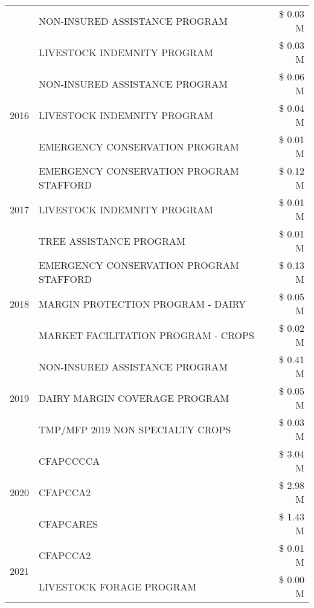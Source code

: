 \begin{tabular}{llr}
 & NON-INSURED ASSISTANCE PROGRAM & \$ 0.03 M \\
 & LIVESTOCK INDEMNITY PROGRAM & \$ 0.03 M \\
\cline{1-3}
\multirow[t]{3}{*}{2016} & NON-INSURED ASSISTANCE PROGRAM                & \$ 0.06 M \\
 & LIVESTOCK INDEMNITY PROGRAM                   & \$ 0.04 M \\
 & EMERGENCY CONSERVATION PROGRAM                & \$ 0.01 M \\
\cline{1-3}
\multirow[t]{3}{*}{2017} & EMERGENCY CONSERVATION PROGRAM STAFFORD & \$ 0.12 M \\
 & LIVESTOCK INDEMNITY PROGRAM & \$ 0.01 M \\
 & TREE ASSISTANCE PROGRAM & \$ 0.01 M \\
\cline{1-3}
\multirow[t]{3}{*}{2018} & EMERGENCY CONSERVATION PROGRAM STAFFORD & \$ 0.13 M \\
 & MARGIN PROTECTION PROGRAM - DAIRY & \$ 0.05 M \\
 & MARKET FACILITATION PROGRAM - CROPS & \$ 0.02 M \\
\cline{1-3}
\multirow[t]{3}{*}{2019} & NON-INSURED ASSISTANCE PROGRAM & \$ 0.41 M \\
 & DAIRY MARGIN COVERAGE PROGRAM & \$ 0.05 M \\
 & TMP/MFP 2019 NON SPECIALTY CROPS & \$ 0.03 M \\
\cline{1-3}
\multirow[t]{3}{*}{2020} & CFAPCCCCA & \$ 3.04 M \\
 & CFAPCCA2 & \$ 2.98 M \\
 & CFAPCARES & \$ 1.43 M \\
\cline{1-3}
\multirow[t]{2}{*}{2021} & CFAPCCA2 & \$ 0.01 M \\
 & LIVESTOCK FORAGE PROGRAM & \$ 0.00 M \\
\cline{1-3}
\bottomrule
\end{tabular}
